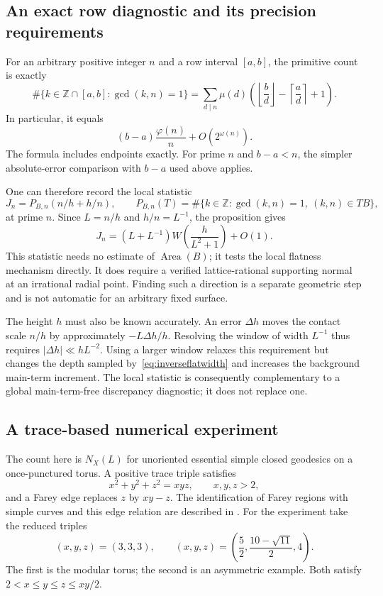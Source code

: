 \documentclass[11pt,a4paper]{article}
\numberwithin{equation}{section}
\theoremstyle{definition}
\theoremstyle{remark}
\newcommand{\ZZ}{\mathbb Z}
\begin{document}
\subsection{An exact row diagnostic and its precision requirements}
\label{subsec:rowdiagnostic}

For an arbitrary positive integer $n$ and a row interval $[a,b]$, the
primitive count is exactly
\begin{equation}
 \#\{k\in\ZZ\cap[a,b]:\gcd(k,n)=1\}
 =\sum_{d\mid n}\mu(d)
 \left(\left\lfloor\frac bd\right\rfloor
       -\left\lceil\frac ad\right\rceil+1\right).
 \label{eq:primitiveintervalexact}
\end{equation}
In particular, it equals
\[
 (b-a)\frac{\varphi(n)}n+O(2^{\omega(n)}).
\]
The formula includes endpoints exactly. For prime $n$ and $b-a<n$,
the simpler absolute-error comparison with $b-a$ used above applies.

One can therefore record the local statistic
\[
 J_n=P_{B,n}(n/h+h/n),\qquad
 P_{B,n}(T)=\#\{k\in\ZZ:\gcd(k,n)=1,\ (k,n)\in TB\},
\]
at prime $n$. Since $L=n/h$ and $h/n=L^{-1}$, the proposition gives
\[
 J_n=(L+L^{-1})W\!\left(\frac h{L^2+1}\right)+O(1).
\]
This statistic needs no estimate of $\operatorname{Area}(B)$; it tests
the local flatness mechanism directly. It does require a verified
lattice-rational supporting normal at an irrational radial point.
Finding such a direction is a separate geometric step and is not
automatic for an arbitrary fixed surface.

The height $h$ must also be known accurately. An error $\Delta h$ moves
the contact scale $n/h$ by approximately $-L\Delta h/h$. Resolving
the window of width $L^{-1}$ thus requires $|\Delta h|\ll hL^{-2}$.
Using a larger window relaxes this requirement but changes the depth
sampled by~\eqref{eq:inverseflatwidth} and increases the background
main-term increment. The local statistic is consequently complementary
to a global main-term-free discrepancy diagnostic; it does not replace
one.



\subsection{A trace-based numerical experiment}
\label{subsec:torustraceexperiment}

The count here is $N_X(L)$ for unoriented essential simple closed
geodesics on a once-punctured torus. A positive trace triple satisfies
\[
 x^2+y^2+z^2=xyz,\qquad x,y,z>2,
\]
and a Farey edge replaces $z$ by $xy-z$. The identification of Farey
regions with simple curves and this edge relation are described in
\cite[Sections~1--2]{BowditchMarkoff}. For the experiment take the reduced
triples
\begin{equation}
 (x,y,z)=(3,3,3),\qquad
 (x,y,z)=\left(\frac52,\frac{10-\sqrt{11}}2,4\right).
 \label{eq:diagnostictracetriples}
\end{equation}
The first is the modular torus; the second is an asymmetric example.
Both satisfy $2<x\le y\le z\le xy/2$.
\end{document}
